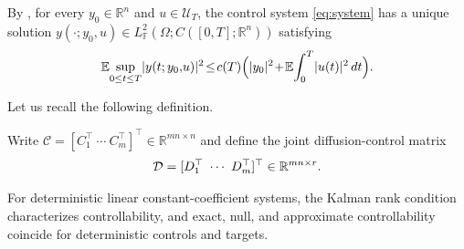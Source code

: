 \documentclass[twocolumn]{autart}
\begin{document}
By \cite[Theorem~3.2]{Lue2021a}, for every $y_0\in\mathbb R^n$ and
$u\in\mathcal U_T$, the control system \eqref{eq:system} has a unique solution
$y(\cdot;y_0,u)\in L^2_{\mathbb F}(\Omega;C([0,T];\mathbb R^n))$
satisfying\vspace{-2mm}
\begin{equation}\label{eq:state-estimate}
\mathbb E\!\sup_{0\leq t\leq T}\!|y(t;y_0,\!u)|^2\!
\leq\! c(T)\Bigl(|y_0|^2\!+\!\mathbb E\!\int_0^T\!|u(t)|^2\,dt\Bigr).\vspace{-2mm}
\end{equation}

Let us recall the following definition.
%
%

Write $\mathcal C=[C_1^\top\ \cdots\ C_m^\top]^\top
\in\mathbb R^{mn\times n}$ and define the joint diffusion-control matrix\vspace{-2mm}
\begin{equation}\label{10.1-eq1}
\mathcal D=[D_1^\top\ \cdots\ D_m^\top]^\top
\in\mathbb R^{mn\times r}.\vspace{-3mm}
\end{equation}
%

For deterministic linear constant-coefficient systems, the Kalman rank condition characterizes controllability, and exact, null, and approximate controllability coincide for deterministic controls and targets.
\end{document}
